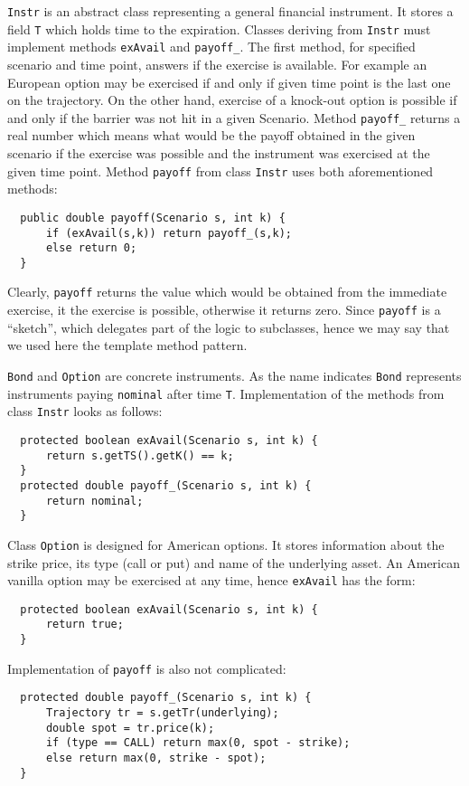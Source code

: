 \documentclass[a4paper,11pt, twoside]{book}
\theoremstyle{definition}
\theoremstyle{remark}
\newcounter{example}[chapter]
\begin{document}
\texttt{Instr} is an abstract class representing a general financial instrument. It stores a field \texttt{T} which holds time to the expiration. Classes deriving from \texttt{Instr} must implement methods \texttt{exAvail} and \texttt{payoff\_}. The first method, for specified scenario and time point, answers if the exercise is available. For example an European option may be exercised if and only if given time point is the last one on the trajectory. On the other hand, exercise of a knock-out option is possible if and only if the barrier was not hit in a given Scenario. Method \texttt{payoff\_} returns a real number which means what would be the payoff obtained in the given scenario if the exercise was possible and the instrument was exercised at the given time point. Method \texttt{payoff} from class \texttt{Instr} uses both aforementioned methods:
\begin{lstlisting}
  public double payoff(Scenario s, int k) {
      if (exAvail(s,k)) return payoff_(s,k);
      else return 0;
  }
\end{lstlisting}
Clearly, \texttt{payoff} returns the value which would be obtained from the immediate exercise, it the exercise is possible, otherwise it returns zero. Since \texttt{payoff} is a ``sketch'', which delegates part of the logic to subclasses, hence we may say that we used here the template method pattern. 

\texttt{Bond} and \texttt{Option} are concrete instruments. As the name indicates \texttt{Bond} represents instruments paying \texttt{nominal} after time \texttt{T}. Implementation of the methods from class \texttt{Instr} looks as follows: 
\begin{lstlisting}
  protected boolean exAvail(Scenario s, int k) {        
      return s.getTS().getK() == k;
  }
  protected double payoff_(Scenario s, int k) {
      return nominal;
  }
\end{lstlisting}

	
Class \texttt{Option} is designed for American options. It stores information about the strike price, its type (call or put) and name of the underlying asset. An American vanilla option may be exercised at any time, hence \texttt{exAvail} has the form:
\begin{lstlisting}
  protected boolean exAvail(Scenario s, int k) {
      return true;
  }
\end{lstlisting}
Implementation of \texttt{payoff} is also not complicated:
\begin{lstlisting}
  protected double payoff_(Scenario s, int k) {
      Trajectory tr = s.getTr(underlying);
      double spot = tr.price(k);
      if (type == CALL) return max(0, spot - strike);
      else return max(0, strike - spot);
  }
\end{lstlisting}
\end{document}
